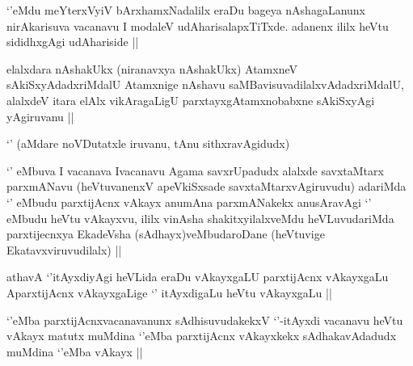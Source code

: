 
\begin{artha}
`\stext'eMdu meYterxVyiV bArxhamxNadalilx eraDu bageya nAshagaLanunx nirAkarisuva vacanavu I modaleV udAharisalapxTiTxde. adanenx ililx heVtu sididhxgAgi udAhariside ||
\end{artha}


\begin{artha}
elalxdara nAshakUkx (niranavxya nAshakUkx) AtamxneV sAkiSxyAdadxriMdalU Atamxnige nAshavu saMBavisuvadilalxvAdadxriMdalU, alalxdeV itara elAlx vikAragaLigU parxtayxgAtamxnobabxne sAkiSxyAgi yAgiruvanu ||
\end{artha}

\begin{artha}
`\stext' (aMdare noVDutatxle iruvanu, tAnu sithxravAgidudx) 
\end{artha}


\begin{artha}
`\stext' eMbuva I vacanava Ivacanavu Agama savxrUpadudx alalxde savxtaMtarx parxmANavu (heVtuvanenxV apeVkiSxsade savxtaMtarxvAgiruvudu) adariMda `\stext' eMbudu parxtijAcnx vAkayx anumAna parxmANakekx anusAravAgi `\stext' eMbudu heVtu vAkayxvu, ililx vinAsha shakitxyilalxveMdu heVLuvudariMda parxtijecnxya EkadeVsha (sAdhayx)veMbudaroDane (heVtuvige Ekatavxviruvudilalx) ||
\end{artha}


\begin{artha}
athavA `\stext'itAyxdiyAgi heVLida eraDu vAkayxgaLU parxtijAcnx vAkayxgaLu AparxtijAcnx vAkayxgaLige `\stext' itAyxdigaLu heVtu vAkayxgaLu ||
\end{artha}


\begin{artha}
`\stext'eMba parxtijAcnxvacanavanunx sAdhisuvudakekxV `\stext'-itAyxdi vacanavu heVtu vAkayx matutx muMdina `\stext'eMba parxtijAcnx vAkayxkekx sAdhakavAdadudx muMdina `\stext'eMba vAkayx ||
\end{artha}



